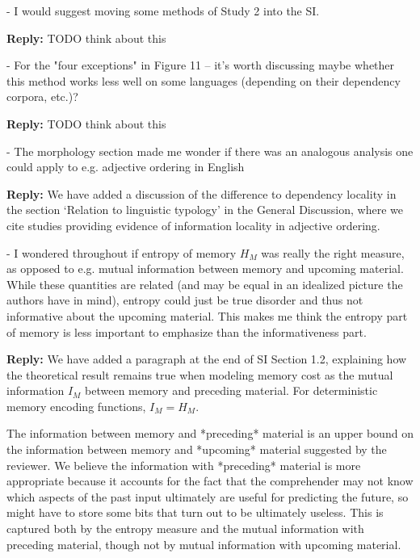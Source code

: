 \documentclass{article}[11pt,a4paper,oneside]
\newenvironment{reply}
  {\par\medskip
   \color{blue}%
   \begin{framed}
   \textbf{Reply: }\ignorespaces}
 {\end{framed}
  \medskip}
\begin{document}
- I would suggest moving some methods of Study 2 into the SI.

\begin{reply}
	TODO think about this
\end{reply}

- For the "four exceptions" in Figure 11 -- it's worth discussing maybe whether this method works less well on some languages (depending on their dependency corpora, etc.)?

\begin{reply}
	TODO think about this
\end{reply}

- The morphology section made me wonder if there was an analogous analysis one could apply to e.g. adjective ordering in English

\begin{reply}
We have added a discussion of the difference to dependency locality in the section `Relation to linguistic typology' in the General Discussion, where we cite studies providing evidence of information locality in adjective ordering.
\end{reply}

- I wondered throughout if entropy of memory $H_M$ was really the right measure, as opposed to e.g. mutual information between memory and upcoming material. While these quantities are related (and may be equal in an idealized picture the authors have in mind), entropy could just be true disorder and thus not informative about the upcoming material. This makes me think the entropy part of memory is less important to emphasize than the informativeness part.

\begin{reply}
We have added a paragraph at the end of SI Section 1.2, explaining how the theoretical result remains true when modeling memory cost as the mutual information $I_M$ between memory and preceding material. For deterministic memory encoding functions, $I_M=H_M$.

The information between memory and *preceding* material is an upper bound on the information between memory and *upcoming* material suggested by the reviewer.
We believe the information with *preceding* material is more appropriate because it accounts for the fact that the comprehender may not know which aspects of the past input ultimately are useful for predicting the future, so might have to store some bits that turn out to be ultimately useless. This is captured both by the entropy measure and the mutual information with preceding material, though not by mutual information with upcoming material. 
\end{reply}
\end{document}

